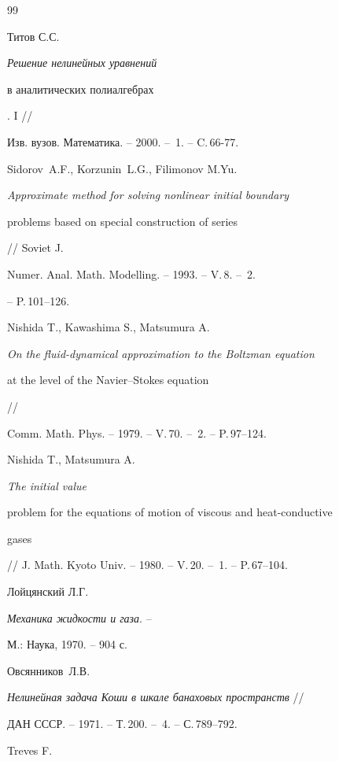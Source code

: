 \begin{thebibliography}{99}





 Титов С.С.


{\em Решение нелинейных уравнений


в аналитических полиалгебрах}. I //


Изв. вузов. Математика. -- 2000. -- \No\,1. -- C.\,66-77.




Sidorov~A.F., Korzunin~L.G., Filimonov M.Yu.


{\em Approximate method for solving nonlinear initial boundary


problems based on special construction of series} // Soviet J.


Numer. Anal. Math. Modelling. -- 1993. -- V.\,8. -- \No\,2.


-- P.\,101--126.




Nishida T., Kawashima S., Matsumura A.


{\em On the fluid-dynamical approximation to the Boltzman equation


at the level of the Navier--Stokes equation} //


Comm. Math. Phys. -- 1979. -- V.\,70. -- \No\,2. -- P.\,97--124.




Nishida T., Matsumura A.


{\em The initial value


problem for the equations of motion of viscous and heat-conductive


gases} // J. Math. Kyoto Univ. -- 1980. -- V.\,20. -- \No\,1. -- P.\,67--104.




Лойцянский Л.Г.


{\em Механика жидкости и газа}. --


М.: Наука, 1970. -- 904 с.




Овсянников~Л.В.


{\em Нелинейная задача Коши в шкале банаховых пространств} //


ДАН СССР. -- 1971. -- Т.\,200. -- \No\,4. -- С.\,789--792.




Treves F.



\end{thebibliography}
